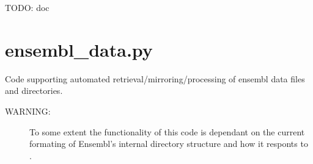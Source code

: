 \documentclass[letterpaper,10pt,english]{sphinxmanual}
\begin{document}

\begin{fulllineitems}
\label{code:gfunc.data_classes.bunchify}
TODO: doc

\end{fulllineitems}

\label{code:module-gfunc.ensembl_data}

\section{ensembl\_data.py}
\label{code:ensembl-data-py}
Code supporting automated retrieval/mirroring/processing of ensembl data files and directories.
\begin{description}
\item[{WARNING:}] \leavevmode
To some extent the functionality of this code is dependant on the
current formating of Ensembl's internal directory structure and how
it responts to .

\end{description}
\end{document}
